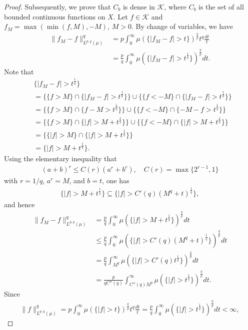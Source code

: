 \documentclass[10pt,reqno]{amsart}
\numberwithin{equation}{section}
\begin{document}
\begin{proof}
Subsequently, we prove that $C_{b}$ is dense in $\mathcal{K}$, where $C_{b}$ is the set of all bounded continuous functions on $X$. Let $f\in\mathcal{K}$ and $f_{M}=\max(\min(f,M),-M)$, $M>0$. By change of variables, we have
\begin{align*}
\|f_{M}-f\|_{L^{p,q}(\mu)}^{q}&=p\int_{0}^{\infty}\mu(\{|f_{M}-f|>t\})^{\frac{q}{p}}t^{q}\frac{dt}{t}\\
&=\frac{p}{q}\int_{0}^{\infty}\mu(\{|f_{M}-f|>t^{\frac{1}{q}}\})^{\frac{q}{p}}dt.
\end{align*}
Note that 
\begin{align*}
&\{|f_{M}-f|>t^{\frac{1}{q}}\}\\
&=\{\{f>M\}\cap\{|f_{M}-f|>t^{\frac{1}{q}}\}\}\cup\{\{f<-M\}\cap\{|f_{M}-f|>t^{\frac{1}{q}}\}\}\\
&=\{\{f>M\}\cap\{f-M>t^{\frac{1}{q}}\}\}\cup\{\{f<-M\}\cap\{-M-f>t^{\frac{1}{q}}\}\}\\
&=\{\{f>M\}\cap\{|f|>M+t^{\frac{1}{q}}\}\}\cup\{\{f<-M\}\cap\{|f|>M+t^{\frac{1}{q}}\}\}\\
&=\{\{|f|>M\}\cap\{|f|>M+t^{\frac{1}{q}}\}\}\\
&=\{|f|>M+t^{\frac{1}{q}}\}.
\end{align*}
Using the elementary inequality that
\begin{align*}
(a+b)^{r}\leq C(r)(a^{r}+b^{r}),\quad C(r)=\max\{2^{r-1},1\}
\end{align*}
with $r=1/q$, $a^{r}=M$, and $b=t$, one has 
\begin{align*}
\{|f|>M+t^{\frac{1}{q}}\}\subseteq\{|f|>C'(q)(M^{q}+t)^{\frac{1}{q}}\},
\end{align*}
and hence
\begin{align*}
\|f_{M}-f\|_{L^{p,q}(\mu)}^{q}&=\frac{p}{q}\int_{0}^{\infty}\mu(\{|f|>M+t^{\frac{1}{q}}\})^{\frac{q}{p}}dt\\
&\leq\frac{p}{q}\int_{0}^{\infty}\mu(\{|f|>C'(q)(M^{q}+t)^{\frac{1}{q}}\})^{\frac{q}{p}}dt\\
&=\frac{p}{q}\int_{M^{q}}^{\infty}\mu(\{|f|>C'(q)t^{\frac{1}{q}}\})^{\frac{q}{p}}dt\\
&=\frac{p}{qC''(q)}\int_{C''(q)M^{q}}^{\infty}\mu(\{|f|>t^{\frac{1}{q}}\})^{\frac{q}{p}}dt.
\end{align*}
Since
\begin{align*}
\|f\|_{L^{p,q}(\mu)}^{q}=p\int_{0}^{\infty}\mu(\{|f|>t\})^{\frac{q}{p}}t^{q}\frac{dt}{t}=\frac{p}{q}\int_{0}^{\infty}\mu(\{|f|>t^{\frac{1}{q}}\})^{\frac{q}{p}}dt<\infty,
\end{align*}

\end{proof}
\end{document}
